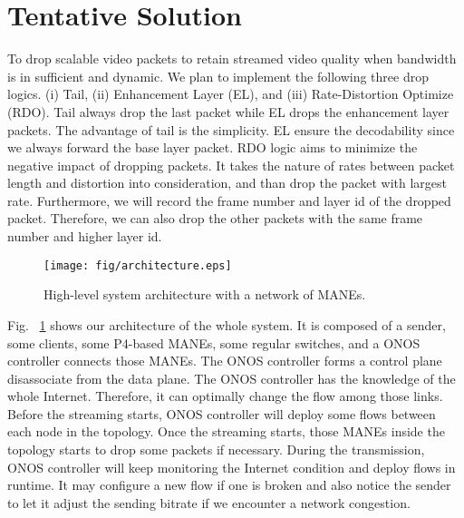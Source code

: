 \section{Tentative Solution} \label{sec:Tentive Soution}

To drop scalable video packets to retain streamed video quality when bandwidth is in sufficient and dynamic. We plan to implement the following three drop logics. (i) Tail, (ii) Enhancement Layer (EL), and (iii) Rate-Distortion Optimize (RDO). Tail always drop the last packet while EL drops the enhancement layer packets.  The advantage of tail is the simplicity. EL ensure the decodability since we always forward the base layer packet. RDO logic aims to minimize the negative impact of dropping packets. It takes the nature of rates between packet length and distortion into consideration, and than drop the packet with largest rate. Furthermore, we will record the frame number and layer id of the dropped packet. Therefore, we can also drop the other packets with the same frame number and higher layer id. 

\begin{figure}[tbh]
    \centering
    \texttt{[image: fig/architecture.eps]}
    \caption{High-level system architecture with a network of MANEs.}
\vspace{-0.1cm}
    \label{architecture} 
\end{figure}

Fig. ~\ref{architecture} shows our architecture of the whole system. It is composed of a sender, some clients, some P4-based MANEs, some regular switches, and a ONOS controller connects those MANEs. The ONOS controller forms a control plane disassociate from the data plane. The ONOS controller has the knowledge of the whole Internet. Therefore, it can optimally change the flow among those links. Before the streaming starts, ONOS controller will deploy some flows between each node in the topology. Once the streaming starts, those MANEs inside the topology starts to drop some packets if necessary. During the transmission, ONOS controller will keep monitoring the Internet condition and deploy flows in runtime. It may configure a new flow if one is broken and also notice the sender to let it adjust the sending bitrate if we encounter a network congestion. 